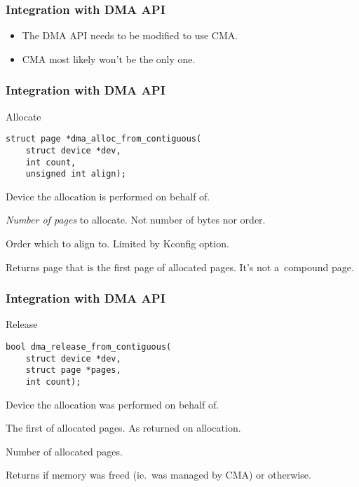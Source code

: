 \begin{frame}
  \frametitle{Integration with DMA API}

  \begin{itemize}
  \item The DMA API needs to be modified to use CMA.
  \item CMA most likely won't be the only one.
  \end{itemize}
\end{frame}

\begin{frame}[fragile]
  \frametitle{Integration with DMA API}

  \begin{block}{Allocate}
\begin{lstlisting}
struct page *dma_alloc_from_contiguous(
    struct device *dev,
    int count,
    unsigned int align);
\end{lstlisting}
  \end{block}

  \begin{description}[countAA]
  \item[{\ttfamily dev}] Device the allocation is performed on behalf
    of.
  \item[{\ttfamily count}] \emph{Number of pages} to
    allocate. {\footnotesize Not number of bytes nor order.}
  \item[{\ttfamily align}] Order which to align to.  Limited by
    Kconfig option.
  \item Returns page that is the first page of  allocated
    pages. {\footnotesize It's not a~compound page.}
  \end{description}
\end{frame}

\begin{frame}[fragile]
  \frametitle{Integration with DMA API}

  \begin{block}{Release}
\begin{lstlisting}
bool dma_release_from_contiguous(
    struct device *dev,
    struct page *pages,
    int count);
\end{lstlisting}
  \end{block}

  \begin{description}[countAA]
  \item[{\ttfamily dev}] Device the allocation was performed on behalf
    of.
  \item[{\ttfamily pages}] The first of allocated
    pages. {\footnotesize As returned on allocation.}
  \item[{\ttfamily count}] Number of allocated pages.
  \item Returns  if memory was freed (ie.\ was managed by
    CMA) or  otherwise.
  \end{description}
\end{frame}

